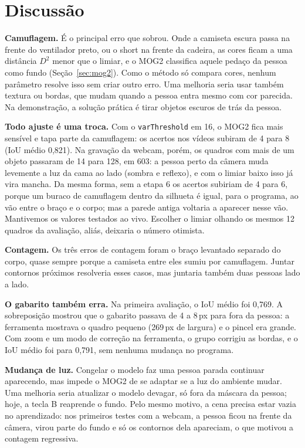 \section{Discussão}
\label{sec:discussao}

\textbf{Camuflagem.} É o principal erro que sobrou. Onde a camiseta
escura passa na frente do ventilador preto, ou o short na frente da
cadeira, as cores ficam a uma distância $D^2$ menor que o limiar, e o
MOG2 classifica aquele pedaço da pessoa como fundo
(Seção~\ref{sec:mog2}). Como o método só compara cores, nenhum
parâmetro resolve isso sem criar outro erro. Uma melhoria seria usar
também textura ou bordas, que mudam quando a pessoa entra mesmo com cor
parecida. Na demonstração, a solução prática é tirar objetos escuros de
trás da pessoa.

\textbf{Todo ajuste é uma troca.} Com o \texttt{varThreshold} em 16, o
MOG2 fica mais sensível e tapa parte da camuflagem: os acertos nos
vídeos subiram de 4 para 8 (IoU médio 0,821). Na gravação da webcam,
porém, os quadros com mais de um objeto passaram de 14 para 128, em
603: a pessoa perto da câmera muda levemente a luz da cama ao lado
(sombra e reflexo), e com o limiar baixo isso já vira mancha. Da mesma
forma, sem a etapa 6 os acertos subiriam de 4 para 6, porque um buraco
de camuflagem dentro da silhueta é igual, para o programa, ao vão entre
o braço e o corpo; mas a parede antiga voltaria a aparecer nesse vão.
Mantivemos os valores testados ao vivo. Escolher o limiar olhando os
mesmos 12 quadros da avaliação, aliás, deixaria o número otimista.

\textbf{Contagem.} Os três erros de contagem foram o braço levantado
separado do corpo, quase sempre porque a camiseta entre eles sumiu por
camuflagem. Juntar contornos próximos resolveria esses casos, mas
juntaria também duas pessoas lado a lado.

\textbf{O gabarito também erra.} Na primeira avaliação, o IoU médio foi
0,769. A sobreposição mostrou que o gabarito passava de 4 a 8\,px para
fora da pessoa: a ferramenta mostrava o quadro pequeno (269\,px de
largura) e o pincel era grande. Com zoom e um modo de correção na
ferramenta, o grupo corrigiu as bordas, e o IoU médio foi para 0,791,
sem nenhuma mudança no programa.

\textbf{Mudança de luz.} Congelar o modelo faz uma pessoa parada
continuar aparecendo, mas impede o MOG2 de se adaptar se a luz do
ambiente mudar. Uma melhoria seria atualizar o modelo devagar, só fora
da máscara da pessoa; hoje, a tecla B reaprende o fundo. Pelo mesmo
motivo, a cena precisa estar vazia no aprendizado: nos primeiros testes
com a webcam, a pessoa ficou na frente da câmera, virou parte do fundo
e só os contornos dela apareciam, o que motivou a contagem regressiva.
